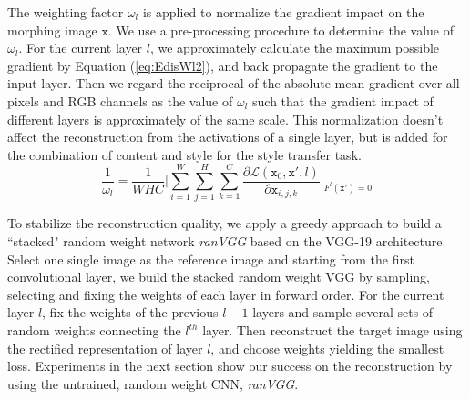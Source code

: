 \documentclass{article}
\begin{document}
The weighting factor $\omega_{l}$ is applied to normalize the gradient impact on the morphing image $\texttt{x}$. We use a pre-processing procedure to determine the value of $\omega_{l}$.
For the current layer $l$, we approximately calculate the maximum possible gradient by Equation (\ref{eq:EdisWl2}), %
and back propagate the gradient to the input layer.
Then we regard the reciprocal of the absolute mean gradient over all pixels and RGB channels as the value of $\omega_{l}$ such that the gradient impact of different layers is approximately of the same scale.
This normalization doesn't affect the reconstruction from the activations of a single layer,
but is added for the combination of content and style for the style transfer task.
\setlength{\belowdisplayskip}{2pt}
\setlength{\abovedisplayskip}{2pt}
\begin{equation}
\frac{1}{\omega_{l}} =\frac{1}{W H C}\bigg|  \displaystyle{ \sum_{i=1}^{W}} \displaystyle{ \sum_{j=1}^{H}} \displaystyle{\sum_{k=1}^{C}}\frac{\partial \mathcal{L}(\texttt{x}_0,\texttt{x}',l)}{\partial{\texttt{x}_{i,j,k}}} \bigg|_{F^l(\texttt{x}')=0}
\label{eq:EdisWl2}
\end{equation}



To stabilize the reconstruction quality, we apply a greedy approach to build a ``stacked" random weight network \emph{ranVGG} based on the VGG-19 architecture.
Select one single image as the reference image and starting from the first convolutional layer,
we build the stacked random weight VGG by sampling, selecting and fixing the weights of each layer in forward order.
For the current layer $l$, fix the weights of the previous $l-1$ layers and sample several sets of random weights connecting the $l^{th}$ layer. Then reconstruct the target image using the rectified representation of layer $l$, and choose weights yielding the smallest loss.
Experiments in the next section show our success on the reconstruction by using the untrained, random weight CNN, \emph{ranVGG}.
\end{document}
